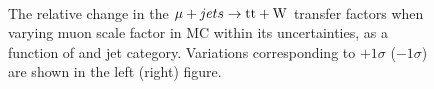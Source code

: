 \begin{figure}[!h]
  \centering
   ~~
  \\

  \caption{\label{fig:tfSyst_muon scale factor_muToTtw} The relative change in the $\mu + jets \rightarrow \mathrm{tt+W}$ transfer
  factors when varying muon scale factor in MC within its uncertainties, as a function of \scalht and jet category. 
  Variations corresponding to $+1\sigma$ ($-1\sigma$) are shown in the left (right) figure. 
  }
\end{figure}
